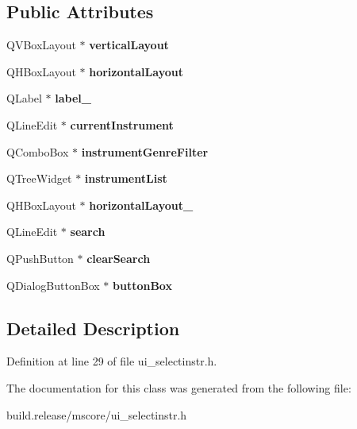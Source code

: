 \subsection*{Public Attributes}
\begin{DoxyCompactItemize}
\item 
\mbox{\label{class_ui___select_instrument_aa163357431cf64a01c3cda25d2052750}} 
Q\+V\+Box\+Layout $\ast$ {\bfseries vertical\+Layout}
\item 
\mbox{\label{class_ui___select_instrument_ae85dd5d7c3bd6461b3a717b2e35fcb0c}} 
Q\+H\+Box\+Layout $\ast$ {\bfseries horizontal\+Layout}
\item 
\mbox{\label{class_ui___select_instrument_ac3d3834d6eb70262c4eaae5528aeaf1e}} 
Q\+Label $\ast$ {\bfseries label\+\_}
\item 
\mbox{\label{class_ui___select_instrument_a0a10b7e0bd0d891b64d8b082e414517a}} 
Q\+Line\+Edit $\ast$ {\bfseries current\+Instrument}
\item 
\mbox{\label{class_ui___select_instrument_ae861298b4b1936367ef426b9a1318e3d}} 
Q\+Combo\+Box $\ast$ {\bfseries instrument\+Genre\+Filter}
\item 
\mbox{\label{class_ui___select_instrument_ad1a9d4f94bf9ebffbe979d21fd30f05b}} 
Q\+Tree\+Widget $\ast$ {\bfseries instrument\+List}
\item 
\mbox{\label{class_ui___select_instrument_aa7ba68a86f094fbc0176bfc3b156bda0}} 
Q\+H\+Box\+Layout $\ast$ {\bfseries horizontal\+Layout\+\_}
\item 
\mbox{\label{class_ui___select_instrument_a17288d7de98834c5077c233eb0936e6d}} 
Q\+Line\+Edit $\ast$ {\bfseries search}
\item 
\mbox{\label{class_ui___select_instrument_a0c6f2f47506eb885eccd2b4017e7852c}} 
Q\+Push\+Button $\ast$ {\bfseries clear\+Search}
\item 
\mbox{\label{class_ui___select_instrument_a8d0362164c5117299e04361ee0c4bfda}} 
Q\+Dialog\+Button\+Box $\ast$ {\bfseries button\+Box}
\end{DoxyCompactItemize}


\subsection{Detailed Description}


Definition at line 29 of file ui\+\_\+selectinstr.\+h.



The documentation for this class was generated from the following file\+:\begin{DoxyCompactItemize}
\item 
build.\+release/mscore/ui\+\_\+selectinstr.\+h\end{DoxyCompactItemize}
